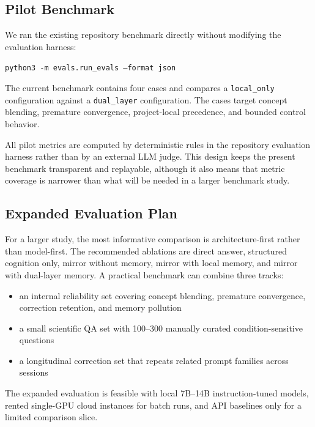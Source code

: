 \documentclass[12pt]{article}
\begin{document}
\subsection{Pilot Benchmark}

We ran the existing repository benchmark directly without modifying the evaluation harness:

\begin{center}
\texttt{python3 -m evals.run\_evals --format json}
\end{center}

The current benchmark contains four cases and compares a \texttt{local\_only} configuration against a \texttt{dual\_layer} configuration. The cases target concept blending, premature convergence, project-local precedence, and bounded control behavior.

All pilot metrics are computed by deterministic rules in the repository evaluation harness rather than by an external LLM judge. This design keeps the present benchmark transparent and replayable, although it also means that metric coverage is narrower than what will be needed in a larger benchmark study.

\subsection{Expanded Evaluation Plan}

For a larger study, the most informative comparison is architecture-first rather than model-first. The recommended ablations are direct answer, structured cognition only, mirror without memory, mirror with local memory, and mirror with dual-layer memory. A practical benchmark can combine three tracks:

\begin{itemize}[leftmargin=1.2em]
\item an internal reliability set covering concept blending, premature convergence, correction retention, and memory pollution
\item a small scientific QA set with 100--300 manually curated condition-sensitive questions
\item a longitudinal correction set that repeats related prompt families across sessions
\end{itemize}

The expanded evaluation is feasible with local 7B--14B instruction-tuned models, rented single-GPU cloud instances for batch runs, and API baselines only for a limited comparison slice.
\end{document}
